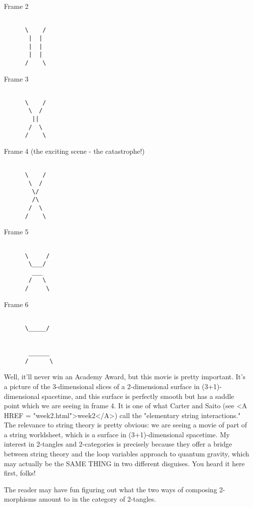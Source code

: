 Frame 2 


\begin{verbatim}

      \    /
       |  |
       |  |
       |  |
      /    \
\end{verbatim}
    

Frame 3


\begin{verbatim}

      \    /
       \  /
        ||
       /  \
      /    \
\end{verbatim}
    

Frame 4 (the exciting scene - the catastrophe!)


\begin{verbatim}

      \    /
       \  /
        \/
        /\
       /  \
      /    \
\end{verbatim}
    

Frame 5


\begin{verbatim}

      \     /
       \___/
        ___
       /   \
      /     \
\end{verbatim}
    

Frame 6


\begin{verbatim}

      \_____/
      
      
       ______     
      /      \

\end{verbatim}
    

Well, it'll never win an Academy Award, but this movie is pretty
important.  It's a picture of the 3-dimensional slices of
a 2-dimensional surface in (3+1)-dimensional spacetime, and this
surface is perfectly smooth but has a saddle point which we are seeing
in frame 4.  It is one of what Carter and Saito (see <A HREF = "week2.html">week2</A>)
call the "elementary string interactions."  The relevance to string
theory is pretty obvious: we are seeing a movie of part of a string
worldsheet, which is a surface in (3+1)-dimensional spacetime.  My
interest in 2-tangles and 2-categories is precisely because they offer a
bridge between string theory and the loop variables approach to quantum
gravity, which may actually be the SAME THING in two different
disguises.  You heard it here first, folks!

The reader may have fun figuring out what the two ways of composing
2-morphisms amount to in the category of 2-tangles.  

